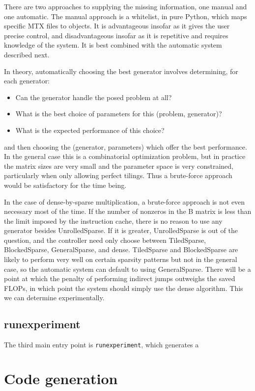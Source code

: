 There are two approaches to supplying the missing information, one manual and one automatic. The manual approach is a whitelist, in pure Python, which maps specific MTX files to  objects. It is advantageous insofar as it gives the user precise control, and disadvantageous insofar as it is repetitive and requires knowledge of the system. It is best combined with the automatic system described next.

In theory, automatically choosing the best generator involves determining, for each generator:
\begin{itemize}
  \item{Can the generator handle the posed problem at all?}
  \item{What is the best choice of parameters for this (problem, generator)?}
  \item{What is the expected performance of this choice?}
\end{itemize}
and then choosing the (generator, parameters) which offer the best performance. In the general case this is a combinatorial optimization problem, but in practice the matrix sizes are very small and the parameter space is very constrained, particularly when only allowing perfect tilings. Thus a brute-force approach would be satisfactory for the time being. 

In the case of dense-by-sparse multiplication, a brute-force approach is not even necessary most of the time. If the number of nonzeros in the B matrix is less than the limit imposed by the instruction cache, there is no reason to use any generator besides UnrolledSparse. If it is greater, UnrolledSparse is out of the question, and the controller need only choose between TiledSparse, BlockedSparse, GeneralSparse, and dense. TiledSparse and BlockedSparse are likely to perform very well on certain sparsity patterns but not in the general case, so the automatic system can default to using GeneralSparse. There will be a point at which the penalty of performing indirect jumps outweighs the saved FLOPs, in which point the system should simply use the dense algorithm. This we can determine experimentally.


\subsection{runexperiment}
The third main entry point is \texttt{runexperiment}, which generates a 




\section{Code generation}
